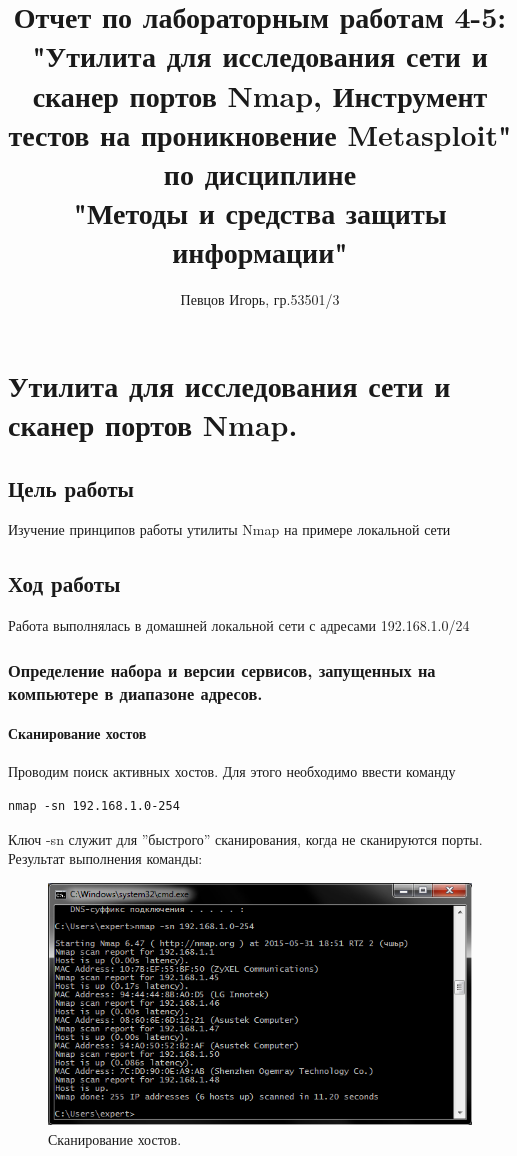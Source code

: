 \documentclass[a4paper, 14pt]{article}				%
\author{Певцов Игорь, гр.53501/3}
\title{Отчет по лабораторным работам 4-5:\\"Утилита для исследования сети и сканер портов Nmap, Инструмент тестов на проникновение Metasploit"\\ по дисциплине\\"Методы и средства защиты информации"}
\begin{document}
\maketitle

\newpage
\tableofcontents{}

\newpage
\section{Утилита для исследования сети и сканер портов Nmap.}

\subsection{Цель работы}
Изучение принципов работы утилиты Nmap на примере локальной сети
\subsection{Ход работы}

Работа выполнялась в домашней локальной сети с адресами 192.168.1.0/24

\subsubsection{Определение набора и версии сервисов, запущенных на компьютере в диапазоне адресов.}
\paragraph{Сканирование хостов\\}

Проводим поиск активных хостов. Для этого необходимо ввести команду
\begin{Verbatim}[frame=single]
	nmap -sn 192.168.1.0-254
\end{Verbatim}
Ключ -sn служит для ''быстрого'' сканирования, когда не сканируются порты.
Результат выполнения команды:
\begin{figure}[h!]
\centering
\includegraphics[width=\textwidth]{rsrc/nmap_1}
\caption{Сканирование хостов.}
\end{figure}
\end{document}
